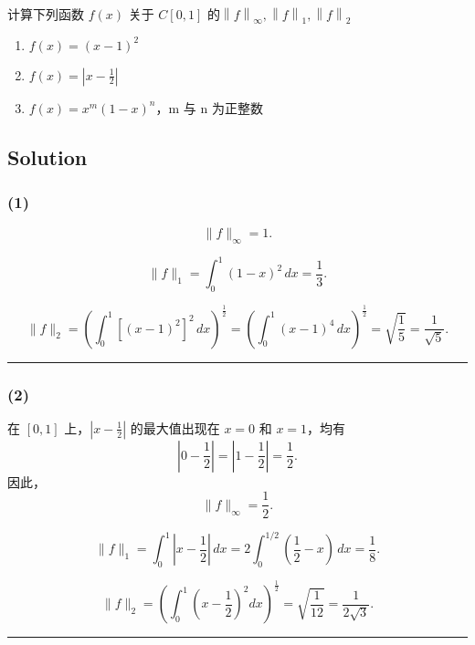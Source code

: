 \documentclass[11pt]{article}
\begin{document}
计算下列函数 \(f(x)\) 关于 \(C[0, 1]\)
的\(\left\lVert f\right\rVert_\infty,\left\lVert f\right\rVert_1,\left\lVert f\right\rVert_2
\)

\begin{enumerate}
\def\labelenumi{(\arabic{enumi})}
\item
  \(f(x) = (x - 1) ^ 2\)
\item
  \(f(x) = \left| x - \frac{1}{2} \right|\)
\item
  \(f(x) = x^m(1 - x)^n\)，m 与 n 为正整数
\end{enumerate}

    \subsection{Solution}\label{solution}

\subsubsection{(1)}\label{section}

\[
\|f\|_{\infty} = 1.
\]

\[
\|f\|_{1} = \int_0^1 (1-x)^2\,dx=\frac{1}{3}.
\]

\[
\|f\|_{2} = \left(\int_0^1 \left[(x-1)^2\right]^2\,dx\right)^{\frac{1}{2}} = \left(\int_0^1 (x-1)^4\,dx\right)^{\frac{1}{2}} = \sqrt{\frac{1}{5}} = \frac{1}{\sqrt{5}}.
\]

\begin{center}\rule{0.5\linewidth}{0.5pt}\end{center}

\subsubsection{(2)}\label{section-1}

在 \([0,1]\) 上，\(\left|x-\frac{1}{2}\right|\) 的最大值出现在 \(x=0\)
和 \(x=1\)，均有 \[
\left|0-\frac{1}{2}\right| = \left|1-\frac{1}{2}\right| = \frac{1}{2}.
\] 因此， \[
\|f\|_{\infty} = \frac{1}{2}.
\]

\[
\|f\|_{1} = \int_0^1 \left|x-\frac{1}{2}\right|\,dx = 2\int_0^{1/2} \left(\frac{1}{2}-x\right)\,dx = \frac{1}{8}.
\]

\[
\|f\|_{2} = \left(\int_0^1 \left(x-\frac{1}{2}\right)^2 dx\right)^{\frac{1}{2}}=\sqrt{\frac{1}{12}} = \frac{1}{2\sqrt{3}}.
\]

\begin{center}\rule{0.5\linewidth}{0.5pt}\end{center}
\end{document}
